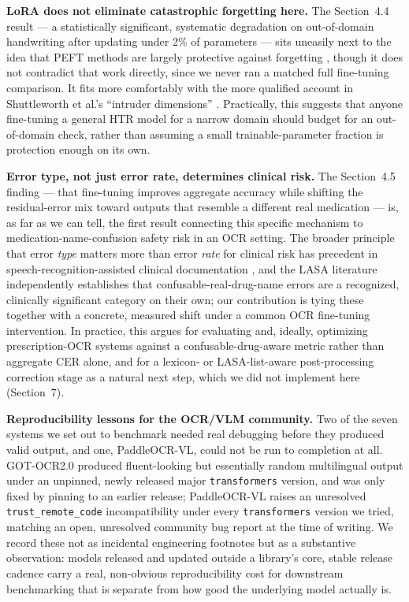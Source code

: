 \documentclass[12pt]{article}
\begin{document}
\textbf{LoRA does not eliminate catastrophic forgetting here.} The Section~4.4 result --- a statistically
significant, systematic degradation on out-of-domain handwriting after updating under 2\% of parameters ---
sits uneasily next to the idea that PEFT methods are largely protective against
forgetting \citep{Biderman2024LoRALearnsLess}, though it does not contradict that work directly, since we
never ran a matched full fine-tuning comparison. It fits more comfortably with the more qualified account in
Shuttleworth et al.'s ``intruder dimensions'' \citep{Shuttleworth2025Illusion}. Practically, this
suggests that anyone fine-tuning a general HTR model for a narrow domain should budget for an
out-of-domain check, rather than assuming a small trainable-parameter fraction is protection enough on its
own.

\textbf{Error type, not just error rate, determines clinical risk.} The Section~4.5 finding --- that
fine-tuning improves aggregate accuracy while shifting the residual-error mix toward outputs that resemble a
different real medication --- is, as far as we can tell, the first result connecting this specific
mechanism to medication-name-confusion safety risk in an OCR setting. The broader principle that error
\textit{type} matters more than error \textit{rate} for clinical risk has precedent in
speech-recognition-assisted clinical documentation \citep{Zhou2018JAMA}, and the LASA
literature \citep{Bryan2021LASA,Ostini2012LASA,Karet2023TallMan} independently establishes that
confusable-real-drug-name errors are a recognized, clinically significant category on their own; our
contribution is tying these together with a concrete, measured shift under a common OCR fine-tuning
intervention. In practice, this argues for evaluating and, ideally, optimizing prescription-OCR systems
against a confusable-drug-aware metric rather than aggregate CER alone, and for a lexicon- or
LASA-list-aware post-processing correction stage as a natural next step, which we did not implement here
(Section~7).

\textbf{Reproducibility lessons for the OCR/VLM community.} Two of the seven systems we set out to
benchmark needed real debugging before they produced valid output, and one, PaddleOCR-VL, could not be run
to completion at all. GOT-OCR2.0 produced fluent-looking but essentially random multilingual output under
an unpinned, newly released major \texttt{transformers} version, and was only fixed by pinning to an earlier
release; PaddleOCR-VL raises an unresolved \texttt{trust\_remote\_code} incompatibility under every
\texttt{transformers} version we tried, matching an open, unresolved community bug report at the time of
writing. We record these not as incidental engineering footnotes but as a substantive observation: models
released and updated outside a library's core, stable release cadence carry a real, non-obvious
reproducibility cost for downstream benchmarking that is separate from how good the underlying model
actually is.
\end{document}
